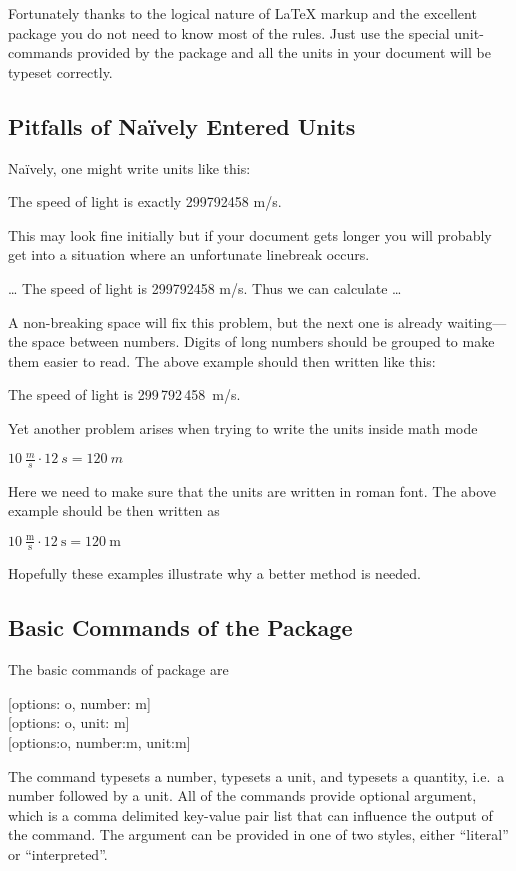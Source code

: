 Fortunately thanks to the logical nature of \LaTeX{} markup and the excellent
 package you do not need to know most of the rules. Just use the special unit-commands provided by the package and all the units in your document will be
typeset correctly.

\subsection{Pitfalls of Naïvely Entered Units}

Naïvely, one might write units like this:
\begin{example}
The speed of light
is exactly 299792458 m/s.
\end{example}
This may look fine initially but if your document gets longer you will probably
get into a situation where an unfortunate linebreak occurs.
\begin{example}
\ldots{} The speed of light
is 299792458 m/s. Thus we
can calculate \ldots
\end{example}
A non-breaking space will fix this problem, but the next one is already waiting---the space between numbers. Digits of
long numbers should be grouped to make them easier to read. The above example
should then written like this:
\begin{example}
The speed of light is
299\,792\,458~m/s.
\end{example}
Yet another problem arises when trying to write the units inside math
mode
\begin{example}
\(10~\frac{m}{s}
  \cdot 12~s = 120~m\)
\end{example}
Here we need to make sure that the units are written in roman font.
The above example should be then written as
\begin{example}
\(10~\frac{\mathrm{m}}
  {\mathrm{s}} 
  \cdot 12~\mathrm{s} 
  = 120~\mathrm{m}\)
\end{example}
\noindent Hopefully these examples illustrate why a better method is needed.

\subsection{Basic Commands of the  Package}

The basic commands of  package are
\begin{lscommand}
  [options: o, number: m]\\
  [options: o, unit: m]\\
  [options:o, number:m, unit:m]
\end{lscommand}
The  command typesets a number,  typesets a unit, and
 typesets a quantity, i.e.\ a number followed by a unit. All of the
commands provide optional  argument, which is a comma delimited
key-value pair list that can influence the output of the command. The
 argument can be provided in one of two styles, either
\enquote{literal} or \enquote{interpreted}.

